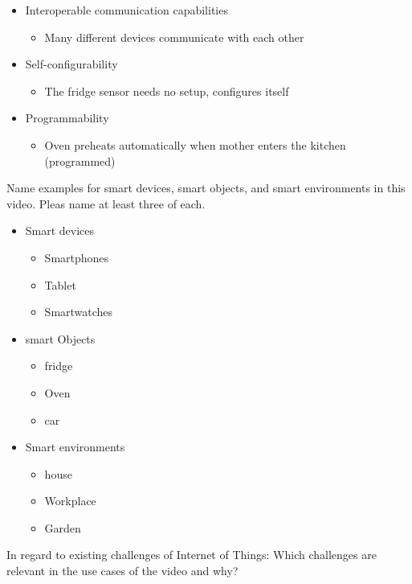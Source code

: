 \documentclass{article}
\begin{document}
\begin{itemize}
\begin{itemize}
          \end{itemize}
    \item Interoperable communication capabilities
          \begin{itemize}
              \item Many different devices communicate with each other
          \end{itemize}
    \item Self-configurability
          \begin{itemize}
              \item The fridge sensor needs no setup, configures itself
          \end{itemize}
    \item Programmability
          \begin{itemize}
              \item Oven preheats automatically when mother enters the kitchen (programmed)
          \end{itemize}
\end{itemize}
Name examples for smart devices, smart objects, and smart environments in this video. Pleas name at least three of each.
\begin{itemize}
    \item Smart devices
          \begin{itemize}
              \item Smartphones
              \item Tablet
              \item Smartwatches
          \end{itemize}
    \item smart Objects
          \begin{itemize}
              \item fridge
              \item Oven
              \item car
          \end{itemize}
    \item Smart environments
          \begin{itemize}
              \item house
              \item Workplace
              \item Garden
          \end{itemize}
\end{itemize}
In regard to existing challenges of Internet of Things: Which challenges are relevant in the use cases of the video and why?
\end{document}
